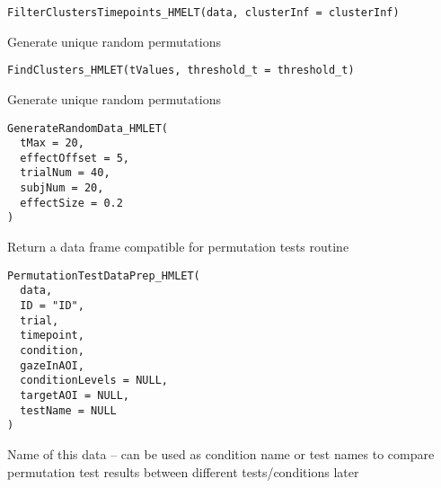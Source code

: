 \documentclass[a4paper]{book}
\begin{document}
%
\begin{Usage}
\begin{verbatim}
FilterClustersTimepoints_HMELT(data, clusterInf = clusterInf)
\end{verbatim}
\end{Usage}
%
\begin{Description}\relax
Generate unique random permutations
\end{Description}
%
\begin{Usage}
\begin{verbatim}
FindClusters_HMLET(tValues, threshold_t = threshold_t)
\end{verbatim}
\end{Usage}
%
\begin{Description}\relax
Generate unique random permutations
\end{Description}
%
\begin{Usage}
\begin{verbatim}
GenerateRandomData_HMLET(
  tMax = 20,
  effectOffset = 5,
  trialNum = 40,
  subjNum = 20,
  effectSize = 0.2
)
\end{verbatim}
\end{Usage}
%
\begin{Description}\relax
Return a data frame compatible for permutation tests routine
\end{Description}
%
\begin{Usage}
\begin{verbatim}
PermutationTestDataPrep_HMLET(
  data,
  ID = "ID",
  trial,
  timepoint,
  condition,
  gazeInAOI,
  conditionLevels = NULL,
  targetAOI = NULL,
  testName = NULL
)
\end{verbatim}
\end{Usage}
%
\begin{Arguments}
\begin{ldescription}
\item[\code{testName}] Name of this data -- can be used as condition name or test names to compare permutation test results between different tests/conditions later
\end{ldescription}
\end{Arguments}
\end{document}
